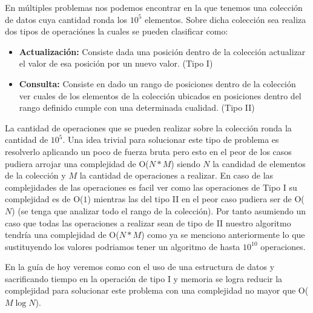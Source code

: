 En múltiples problemas nos podemos encontrar en la que tenemos una colección de datos cuya cantidad ronda los $10^{5}$ elementos. Sobre dicha colección sea realiza dos tipos de operaciónes la cuales se pueden clasificar como:
\begin{itemize}
	\item \textbf{Actualización:} Consiste dada una posición dentro de la colección actualizar el valor de esa posición por un nuevo valor. (Tipo I)
	\item \textbf{Consulta:} Consiste en dado un rango de posiciones dentro de la colección ver cuales de los elementos de la colección ubicados en posiciones dentro del rango definido cumple con una determinada cualidad. (Tipo II)
\end{itemize}

La cantidad de operaciones que se pueden realizar sobre la colección ronda la cantidad de $10^{5}$. Una idea trivial para solucionar este tipo de problema es resolverlo aplicando un poco de fuerza bruta pero esto en el  peor de los casos pudiera arrojar una complejidad  de O($N*M$) siendo $N$ la candidad de elementos de la colección y $M$ la cantidad de operaciones a realizar. En caso de las complejidades de las operaciones es facil ver como las operaciones de Tipo I su complejidad es de O($1$) mientras las del tipo II en el peor caso pudiera ser de O($N$) (se tenga que analizar todo el rango de la colección). Por tanto asumiendo un caso que todas las operaciones a realizar sean de tipo de II nuestro algoritmo tendría una complejidad de O($N*M$) como ya se menciono anteriormente lo que sustituyendo los valores podriamos tener un algoritmo de hasta $10^{10}$ operaciones.

En la guía de hoy veremos como con el uso de una estructura de datos y sacrificando tiempo en la operación de tipo I y memoria se logra reducir la complejidad para solucionar este problema con una complejidad no mayor que O($M\log N$).